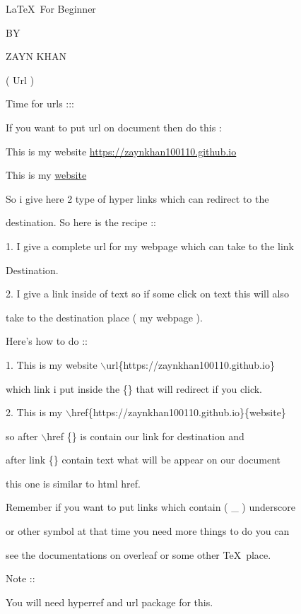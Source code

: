 \documentclass[11pt]{article}
\begin{document}
\begin{center}
\Large \LaTeX\ For Beginner

\small BY

\Large ZAYN KHAN

\large ( Url )
\end{center}

{\large Time for urls ::: }

If you want to put url on document then do this :

\vspace{1cm}

This is my website  \url{https://zaynkhan100110.github.io}

This is my  \href{https://zaynkhan100110.github.io}{website}

\vspace{1cm}

So i give here 2 type of hyper links which can redirect to the

destination. So here is the recipe ::

1. I give a complete url for my webpage which can take to the link

Destination.

2. I give a link inside of text so if some click on text this will also

take to the destination place ( my webpage ).


Here's how to do ::

\vspace{0.5cm}

1. This is my website $\backslash$url\{https://zaynkhan100110.github.io\}

\vspace{0.5cm}

which link i put inside the \{\} that will redirect if you click.

\vspace{0.5cm}

2. This is my $\backslash$href\{https://zaynkhan100110.github.io\}\{website\}

\vspace{0.5cm}

so after $\backslash$href \{\} is contain our link for destination and

after link \{\} contain text what will be appear on our document

this one is similar to html href.

\vspace{0.5cm}

Remember if you want to put links which contain ( \_ ) underscore

or other symbol at that time you need more things to do you can

 see the documentations on overleaf or some other \TeX\ place.

\vspace{0.5cm}

Note ::

You will need hyperref and url package for this.
\end{document}
